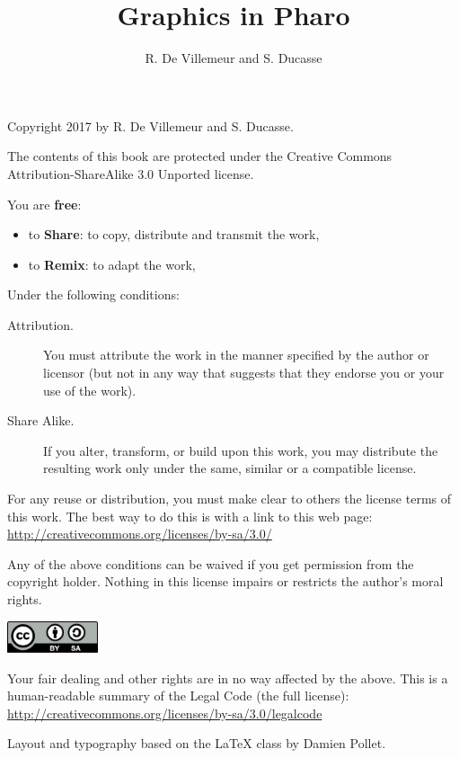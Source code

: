 \documentclass[10pt,twoside,english]{_support/latex/sbabook/sbabook}
\title{Graphics in Pharo}
\author{R. De Villemeur and S. Ducasse}
\begin{document}
\maketitle
\pagestyle{titlingpage}
\thispagestyle{titlingpage} %

\cleartoverso
{\small

  Copyright 2017 by R. De Villemeur and S. Ducasse.

  The contents of this book are protected under the Creative Commons
  Attribution-ShareAlike 3.0 Unported license.

  You are \textbf{free}:
  \begin{itemize}
  \item to \textbf{Share}: to copy, distribute and transmit the work,
  \item to \textbf{Remix}: to adapt the work,
  \end{itemize}

  Under the following conditions:
  \begin{description}
  \item[Attribution.] You must attribute the work in the manner specified by the
    author or licensor (but not in any way that suggests that they endorse you
    or your use of the work).
  \item[Share Alike.] If you alter, transform, or build upon this work, you may
    distribute the resulting work only under the same, similar or a compatible
    license.
  \end{description}

  For any reuse or distribution, you must make clear to others the
  license terms of this work. The best way to do this is with a link to
  this web page: \\
  \url{http://creativecommons.org/licenses/by-sa/3.0/}

  Any of the above conditions can be waived if you get permission from
  the copyright holder. Nothing in this license impairs or restricts the
  author's moral rights.

  \begin{center}
    \includegraphics[width=0.2\textwidth]{_support/latex/sbabook/CreativeCommons-BY-SA.pdf}
  \end{center}

  Your fair dealing and other rights are in no way affected by the
  above. This is a human-readable summary of the Legal Code (the full
  license): \\
  \url{http://creativecommons.org/licenses/by-sa/3.0/legalcode}

  \vfill

  Layout and typography based on the  \LaTeX{} class by Damien
  Pollet.
}
\end{document}
